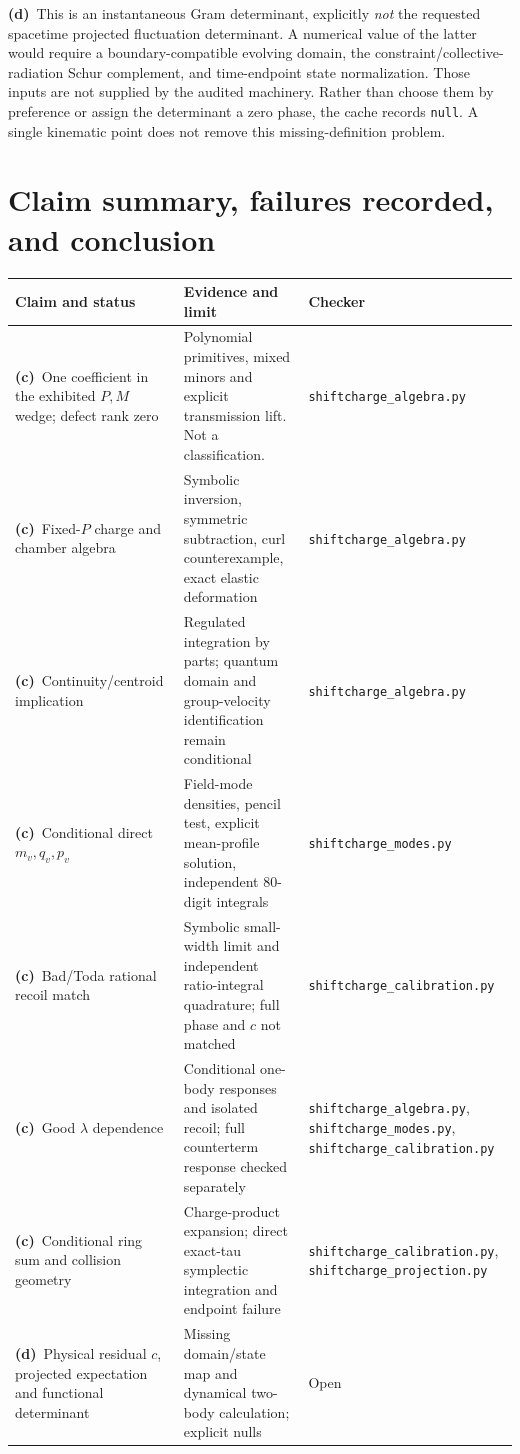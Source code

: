 \documentclass[11pt,a4paper]{article}
\newcommand{\C}{\textbf{(c)}\ }
\newcommand{\D}{\textbf{(d)}\ }
\newcommand{\file}[1]{\nolinkurl{#1}}
\newcommand{\alg}{\file{shiftcharge_algebra.py}}
\newcommand{\modes}{\file{shiftcharge_modes.py}}
\newcommand{\calcheck}{\file{shiftcharge_calibration.py}}
\newcommand{\proj}{\file{shiftcharge_projection.py}}
\begin{document}
\D This is an instantaneous Gram determinant, explicitly \emph{not} the
requested spacetime projected fluctuation determinant. A numerical value
of the latter would require a boundary-compatible evolving domain, the
constraint/collective-radiation Schur complement, and time-endpoint state
normalization. Those inputs are not supplied by the audited machinery.
Rather than choose them by preference or assign the determinant a zero
phase, the cache records \file{null}. A single kinematic point does not
remove this missing-definition problem.

\section{Claim summary, failures recorded, and conclusion}
\small
\begin{longtable}{@{}L{5.3cm}L{6.1cm}L{3.4cm}@{}}\toprule
Claim and status & Evidence and limit & Checker\\\midrule\endhead
\C One coefficient in the exhibited $P,M$ wedge; defect rank zero & Polynomial primitives, mixed minors and explicit transmission lift. Not a classification. & \alg\\[3pt]
\C Fixed-$P$ charge and chamber algebra & Symbolic inversion, symmetric subtraction, curl counterexample, exact elastic deformation & \alg\\[3pt]
\C Continuity/centroid implication & Regulated integration by parts; quantum domain and group-velocity identification remain conditional & \alg\\[3pt]
\C Conditional direct $m_v,q_v,p_v$ & Field-mode densities, pencil test, explicit mean-profile solution, independent 80-digit integrals & \modes\\[3pt]
\C Bad/Toda rational recoil match & Symbolic small-width limit and independent ratio-integral quadrature; full phase and $c$ not matched & \calcheck\\[3pt]
\C Good $\lambda$ dependence & Conditional one-body responses and isolated recoil; full counterterm response checked separately & \alg, \modes, \calcheck\\[3pt]
\C Conditional ring sum and collision geometry & Charge-product expansion; direct exact-tau symplectic integration and endpoint failure & \calcheck, \proj\\[3pt]
\D Physical residual $c$, projected expectation and functional determinant & Missing domain/state map and dynamical two-body calculation; explicit nulls & Open\\\bottomrule
\end{longtable}
\normalsize
\end{document}
